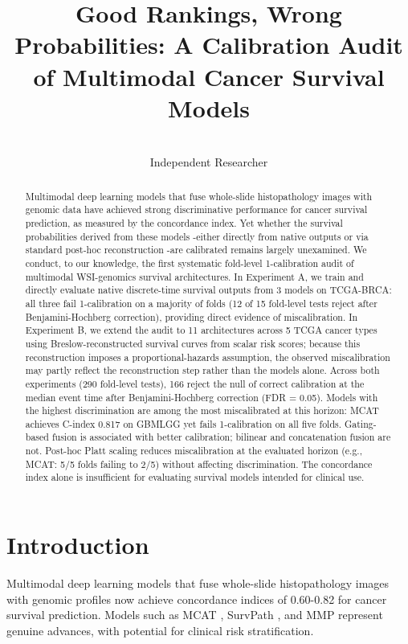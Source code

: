 \documentclass[pmlr]{jmlr}
\title[Good Rankings, Wrong Probabilities]{Good Rankings, Wrong Probabilities: A Calibration Audit of Multimodal Cancer Survival Models}
\author{\Name{Sajad Ghawami}
       \Email{sajad@ghawami.io}\\
       \addr Independent Researcher}
\begin{document}
\maketitle

\begin{abstract}
Multimodal deep learning models that fuse whole-slide histopathology images with genomic data have achieved strong discriminative performance for cancer survival prediction, as measured by the concordance index. Yet whether the survival probabilities derived from these models -either directly from native outputs or via standard post-hoc reconstruction -are calibrated remains largely unexamined. We conduct, to our knowledge, the first systematic fold-level 1-calibration audit of multimodal WSI-genomics survival architectures. In Experiment A, we train and directly evaluate native discrete-time survival outputs from 3 models on TCGA-BRCA: all three fail 1-calibration on a majority of folds (12 of 15 fold-level tests reject after Benjamini-Hochberg correction), providing direct evidence of miscalibration. In Experiment B, we extend the audit to 11 architectures across 5 TCGA cancer types using Breslow-reconstructed survival curves from scalar risk scores; because this reconstruction imposes a proportional-hazards assumption, the observed miscalibration may partly reflect the reconstruction step rather than the models alone. Across both experiments (290 fold-level tests), 166 reject the null of correct calibration at the median event time after Benjamini-Hochberg correction (FDR = 0.05). Models with the highest discrimination are among the most miscalibrated at this horizon: MCAT achieves C-index 0.817 on GBMLGG yet fails 1-calibration on all five folds. Gating-based fusion is associated with better calibration; bilinear and concatenation fusion are not. Post-hoc Platt scaling reduces miscalibration at the evaluated horizon (e.g., MCAT: 5/5 folds failing to 2/5) without affecting discrimination. The concordance index alone is insufficient for evaluating survival models intended for clinical use.
\end{abstract}

\section{Introduction}

Multimodal deep learning models that fuse whole-slide histopathology images with genomic profiles now achieve concordance indices of 0.60-0.82 for cancer survival prediction. Models such as MCAT \citep{chen2021multimodal}, SurvPath \citep{jaume2024modeling}, and MMP \citep{song2024multimodal} represent genuine advances, with potential for clinical risk stratification.
\end{document}
